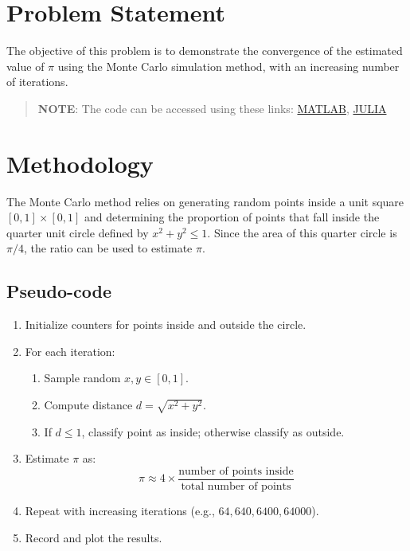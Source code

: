 \section*{Problem Statement}
The objective of this problem is to demonstrate the convergence of the estimated value of $\pi$ using the Monte Carlo simulation method, with an increasing number of iterations.

\begin{quote}
  \textbf{NOTE}: The code can be accessed using these links: \href{https://raw.githubusercontent.com/HavokSahil/computational-techniques-assignments/refs/heads/main/assignment0/a1_pi_monte_carlo.m}{MATLAB}, \href{https://raw.githubusercontent.com/HavokSahil/computational-techniques-assignments/refs/heads/main/assignment0/a1_pi_monte_carlo.jl}{JULIA}
\end{quote}

\section*{Methodology}
The Monte Carlo method relies on generating random points inside a unit square $[0,1] \times [0,1]$ and determining the proportion of points that fall inside the quarter unit circle defined by $x^2 + y^2 \leq 1$. Since the area of this quarter circle is $\pi/4$, the ratio can be used to estimate $\pi$.

\subsection*{Pseudo-code}
\begin{enumerate}
  \item Initialize counters for points inside and outside the circle.
  \item For each iteration:
  \begin{enumerate}
    \item Sample random $x, y \in [0,1]$.
    \item Compute distance $d = \sqrt{x^2 + y^2}$.
    \item If $d \leq 1$, classify point as inside; otherwise classify as outside.
  \end{enumerate}
  \item Estimate $\pi$ as:
  \[
    \pi \approx 4 \times \frac{\text{number of points inside}}{\text{total number of points}}
  \]
  \item Repeat with increasing iterations (e.g., $64, 640, 6400, 64000$).
  \item Record and plot the results.
\end{enumerate}

